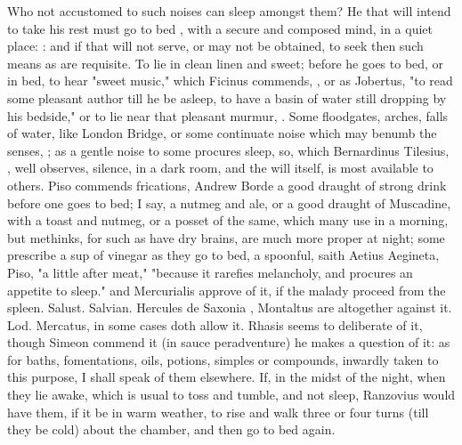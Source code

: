 {Who not accustomed to such noises can sleep amongst them? He that will intend to take his rest must go to bed , with a secure and composed mind, in a quiet place: : and if that will not serve, or may not be obtained, to seek then such means as are requisite. To lie in clean linen and sweet; before he goes to bed, or in bed, to hear "sweet music," which Ficinus commends, , or as Jobertus,  "to read some pleasant author till he be asleep, to have a basin of water still dropping by his bedside," or to lie near that pleasant murmur, . Some floodgates, arches, falls of water, like London Bridge, or some continuate noise which may benumb the senses, ; as a gentle noise to some procures sleep, so, which Bernardinus Tilesius, , well observes, silence, in a dark room, and the will itself, is most available to others. Piso commends frications, Andrew Borde a good draught of strong drink before one goes to bed; I say, a nutmeg and ale, or a good draught of Muscadine, with a toast and nutmeg, or a posset of the same, which many use in a morning, but methinks, for such as have dry brains, are much more proper at night; some prescribe a sup of vinegar as they go to bed, a spoonful, saith Aetius  Aegineta,  Piso, "a little after meat," "because it rarefies melancholy, and procures an appetite to sleep."  and Mercurialis approve of it, if the malady proceed from the spleen. Salust. Salvian.  Hercules de Saxonia , Montaltus  are altogether against it. Lod. Mercatus,  in some cases doth allow it. Rhasis seems to deliberate of it, though Simeon commend it (in sauce peradventure) he makes a question of it: as for baths, fomentations, oils, potions, simples or compounds, inwardly taken to this purpose, I shall speak of them elsewhere. If, in the midst of the night, when they lie awake, which is usual to toss and tumble, and not sleep, Ranzovius would have them, if it be in warm weather, to rise and walk three or four turns (till they be cold) about the chamber, and then go to bed again.

}
